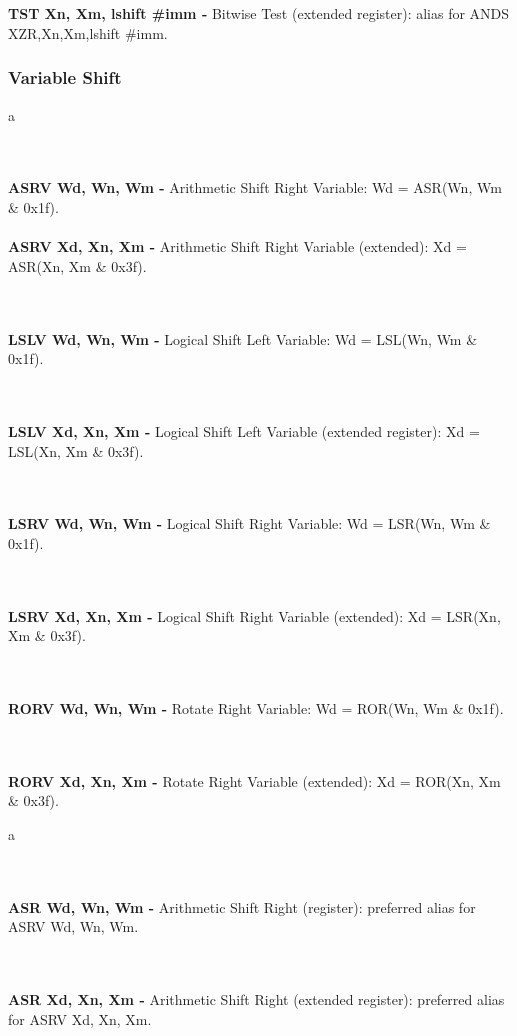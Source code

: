\documentclass[12pt,a4paper,utf8]{ppgsi}
\begin{document}
\\\\\textbf{TST Xn, Xm{, lshift \#imm} -} Bitwise Test (extended register): alias for ANDS XZR,Xn,Xm{,lshift \#imm}. 


\subsubsection{Variable Shift}
a

\\\\\textbf{ASRV Wd, Wn, Wm -} Arithmetic Shift Right Variable: Wd = ASR(Wn, Wm \& 0x1f).
\\\\\textbf{ASRV Xd, Xn, Xm -} Arithmetic Shift Right Variable (extended): Xd = ASR(Xn, Xm \& 0x3f). 

\\\\\textbf{LSLV Wd, Wn, Wm -} Logical Shift Left Variable: Wd = LSL(Wn, Wm \& 0x1f). 

\\\\\textbf{LSLV Xd, Xn, Xm -} Logical Shift Left Variable (extended register): Xd = LSL(Xn, Xm \& 0x3f). 

\\\\\textbf{LSRV Wd, Wn, Wm -} Logical Shift Right Variable: Wd = LSR(Wn, Wm \& 0x1f). 

\\\\\textbf{LSRV Xd, Xn, Xm -} Logical Shift Right Variable (extended): Xd = LSR(Xn, Xm \& 0x3f). 

\\\\\textbf{RORV Wd, Wn, Wm -} Rotate Right Variable: Wd = ROR(Wn, Wm \& 0x1f). 

\\\\\textbf{RORV Xd, Xn, Xm -} Rotate Right Variable (extended): Xd = ROR(Xn, Xm \& 0x3f). 

a

\\\\\textbf{ASR Wd, Wn, Wm -} Arithmetic Shift Right (register): preferred alias for ASRV Wd, Wn, Wm. 

\\\\\textbf{ASR Xd, Xn, Xm -} Arithmetic Shift Right (extended register): preferred alias for ASRV Xd, Xn, Xm. 
\end{document}
